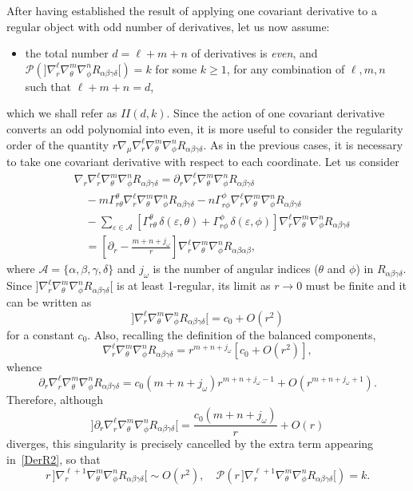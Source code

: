 \documentclass[aps,prd,a4paper,twocolumn,showpacs,showkeys,preprintnumbers,amsmath,amssymb,nofootinbib]{revtex4-2}
\numberwithin{equation}{section}
\def\beq{\begin{equation}}
\def\eeq{\end{equation}}
\def\al{\alpha}
\def\be{\beta}
\def\ga{\gamma}
\def\Ga{\Gamma}
\def\de{\delta}
\def\th{\theta}
\def\om{\omega}
\def\na{\nabla}
\begin{document}
After having established the result of applying one covariant derivative to a regular object with odd number of derivatives, let us now assume:
\begin{itemize}
\item[$II$.] the total number $d=\ell+m+n$ of derivatives is \textit{even}, and $\mathscr{P}( {]\na_r^{\ell} \na_\th^m \na_\phi^n R_{\al\be\ga\de}[})=k$ for some $k \geqslant 1$, for any combination of $\ell,m,n$ such that $\ell+m+n=d$,
\end{itemize}
which we shall refer as $II(d,k)$. 
Since the action of one covariant derivative converts an odd polynomial into even, it is more useful to consider the regularity order of the quantity $r\na_\mu \na_r^\ell \na_\th^m \na_\phi^n R_{\al\be\ga\de}$. As in the previous cases, it is necessary to take one covariant derivative with respect to each coordinate. Let us consider 
%
\beq \label{DerR2}
\begin{split}
& \na_r \na_r^\ell \na_\th^m \na_\phi^n R_{\al\be\ga\de}  =  \partial_r \na_r^\ell \na_\th^m \na_\phi^n R_{\al\be\ga\de}  
\\
& \quad - m \Ga^\th_{r\th} \na_r^{\ell} \na_\th^{m} \na_\phi^{n} R_{\al\be\ga\de}  - n \Ga^\phi_{r\phi} \na_r^{\ell} \na_\th^{m} \na_\phi^{n} R_{\al\be\ga\de}
\\
& \quad - \sum_{\varepsilon \in \mathcal{A}} \left[   \Ga^\th_{r\th}  \, \de(\varepsilon,\th) + \Ga^\phi_{r\phi} \, \de(\varepsilon,\phi) \right]  \na_r^{\ell} \na_\th^{m} \na_\phi^{n} R_{\al\be\ga\de}
\\
& \quad =  \left[  \partial_r  - \frac{m + n + j_\om}{r}\right]  \na_r^\ell \na_\th^m \na_\phi^n R_{\al\be\al\be},
\end{split}
\eeq
where $\mathcal{A} = \lbrace \al,\be,\ga,\de \rbrace$ and $j_\om$ is the number of angular indices ($\th$ and $\phi$) in $R_{\al\be\ga\de}$.
Since ${]\na_r^{\ell} \na_\th^m \na_\phi^n R_{\al\be\ga\de}[}$ is at least 1-regular, its limit as $r \to 0$ must be finite and it can be written as 
%
\beq
{]\na_r^{\ell} \na_\th^m \na_\phi^n R_{\al\be\ga\de}[} = c_0 + O(r^2) 
\eeq
for a constant $c_0$.
Also, recalling the definition of the balanced components,
\beq
\na_r^{\ell} \na_\th^m \na_\phi^n R_{\al\be\ga\de} = r^{m + n + j_\om} \left[ c_0 + O(r^2) \right] ,
\eeq
whence
\beq
\partial_r \na_r^{\ell} \na_\th^m \na_\phi^n R_{\al\be\ga\de} =  c_0 (m + n + j_\om) r^{m + n + j_\om - 1} 
+ O(r^{m + n + j_\om+1}) .
\nonumber
\eeq
Therefore, although
%
\beq
{]\partial_r \na_r^{\ell} \na_\th^m \na_\phi^n R_{\al\be\ga\de}[} = \frac{c_0(m + n + j_\om)}{r} + O(r)
\eeq
diverges, this singularity is precisely cancelled by the extra term appearing in~\eqref{DerR2}, so that
%
\beq \label{Resultado2r}
{r \,]\na_r^{\ell+1} \na_\th^m \na_\phi^n R_{\al\be\ga\de} [} \sim O(r^2) ,
\quad \mathscr{P}({r \, ]\na_r^{\ell+1} \na_\th^m \na_\phi^n R_{\al\be\ga\de}[})=k.
\eeq
\end{document}
